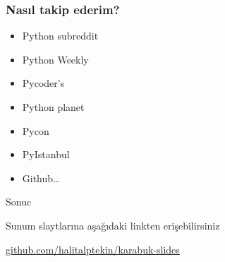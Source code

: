 \documentclass[10pt, compress]{beamer}
\begin{document}
\begin{frame}[fragile]
    \frametitle{Nasıl takip ederim?}
    \begin{itemize}
        \item Python subreddit
        \item Python Weekly
        \item Pycoder’s
        \item Python planet
        \item Pycon
        \item PyIstanbul
        \item Github\ldots
    \end{itemize}  
\end{frame}

\begin{frame}{Sonuc}

\begin{center}Sunum slaytlarına aşağıdaki linkten erişebilirsiniz

\url{github.com/halitalptekin/karabuk-slides}\end{center}


\end{frame}

\end{document}
